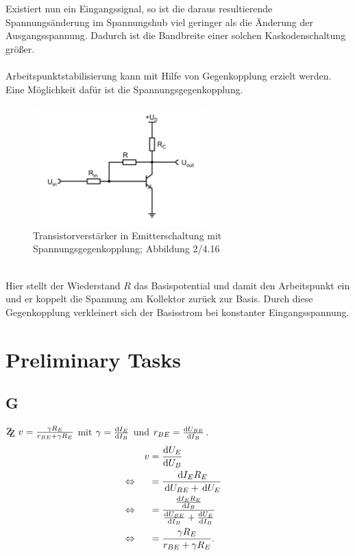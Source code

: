 \documentclass[a4paper,10pt]{article}
\newcommand{\td}{\,\text{d}}
\newcommand{\zz}{\mathrm{Z\kern-.3em\raise-0.5ex\hbox{Z} }}
\numberwithin{equation}{section}
\begin{document}
\begin{multicols}{2}
        Existiert nun ein Eingangssignal, so ist die daraus resultierende Spannungsänderung im Spannungshub viel geringer als die Änderung der Ausgangsspannung.
        Dadurch ist die Bandbreite einer solchen Kaskodenschaltung größer.
        \\\\Arbeitspunktstabilisierung kann mit Hilfe von Gegenkopplung erzielt werden.
        Eine Möglichkeit dafür ist die Spannungsgegenkopplung.
        \begin{figure}[h]
                \centering
                \includegraphics[width=0.6\textwidth]{spannungsgegenkopplung.png}
                \caption{Transistorverstärker in Emitterschaltung mit Spannungsgegenkopplung; Abbildung 2/4.16 \cite{Praktikumsanleitung}}
                \vspace{100cm}
        \end{figure}\\
        Hier stellt der Wiederstand $R$ das Basispotential und damit den Arbeitspunkt ein und er koppelt die Spannung am Kollektor zurück zur Basis.
        Durch diese Gegenkopplung verkleinert sich der Basisstrom bei konstanter Eingangsspannung.

	\newpage
	\section{Preliminary Tasks}
	\subsection{G}
	$\zz\ v=\tfrac{\gamma R_E}{r_{BE}+\gamma R_E}$ mit $\gamma =\diff[]{I_E}{I_B}$ und $r_{BE}=\diff[]{U_{BE}}{I_B}$.
	\begin{align}
		                &  & v & = \diff[]{U_E}{U_B}                                                    &  &           \\
		\Leftrightarrow &  &   & = \dfrac{\td I_ER_E}{\td U_{BE}+\td U_E}                               &  & \nonumber \\
		\Leftrightarrow &  &   & = \dfrac{\diff[]{I_ER_E}{I_B}}{\diff[]{U_{BE}}{I_B}+\diff[]{U_E}{I_B}} &  & \nonumber \\
		\Leftrightarrow &  &   & = \dfrac{\gamma R_E}{r_{BE}+\gamma R_E}.                               &  &
	\end{align}


\end{multicols}
\end{document}
